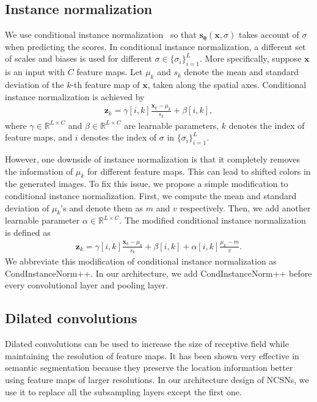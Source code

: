 \documentclass{article}
\newcommand{\mbb}[1]{\mathbb{#1}}
\newcommand{\bfx}{\mathbf{x}}
\newcommand{\bfz}{\mathbf{z}}
\newcommand{\bftheta}{{\boldsymbol{\theta}}}
\newcommand{\bfs}{\mathbf{s}}
\begin{document}
\subsection{Instance normalization} 
We use conditional instance normalization~\cite{dumoulin2017learned-iclr} so that $\bfs_\bftheta(\bfx, \sigma)$ takes account of $\sigma$ when predicting the scores. In conditional instance normalization, a different set of scales and biases is used for different $\sigma \in \{\sigma_i\}_{i=1}^L$. More specifically, suppose $\bfx$ is an input with $C$ feature maps. Let $\mu_k$ and $s_k$ denote the mean and standard deviation of the $k$-th feature map of $\bfx$, taken along the spatial axes. Conditional instance normalization is achieved by
\begin{align*}
    \bfz_k = \gamma[i, k] \frac{\bfx_k - \mu_k}{s_k} + \beta[i, k],
\end{align*}
where $\gamma \in \mbb{R}^{L \times C}$ and $\beta \in \mbb{R}^{L \times C}$ are learnable parameters, $k$ denotes the index of feature maps, and $i$ denotes the index of $\sigma$ in $\{\sigma_i\}_{i=1}^L$. 

However, one downside of instance normalization is that it completely removes the information of $\mu_k$ for different feature maps. This can lead to shifted colors in the generated images. To fix this issue, we propose a simple modification to conditional instance normalization. First, we compute the mean and standard deviation of $\mu_k$'s and denote them as $m$ and $v$ respectively. Then, we add another learnable parameter $\alpha \in \mbb{R}^{L \times C}$. The modified conditional instance normalization is defined as
\begin{align*}
    \bfz_k = \gamma[i, k] \frac{\bfx_k - \mu_k}{s_k} + \beta[i, k] + \alpha[i,k] \frac{\mu_k - m}{v}.
\end{align*}
We abbreviate this modification of conditional instance normalization as CondInstanceNorm++. In our architecture, we add CondInstanceNorm++ before every convolutional layer and pooling layer.

\subsection{Dilated convolutions}
Dilated convolutions can be used to increase the size of receptive field while maintaining the resolution of feature maps. It has been shown very effective in semantic segmentation because they preserve the location information better using feature maps of larger resolutions. In our architecture design of NCSNs, we use it to replace all the subsampling layers except the first one.
\end{document}
